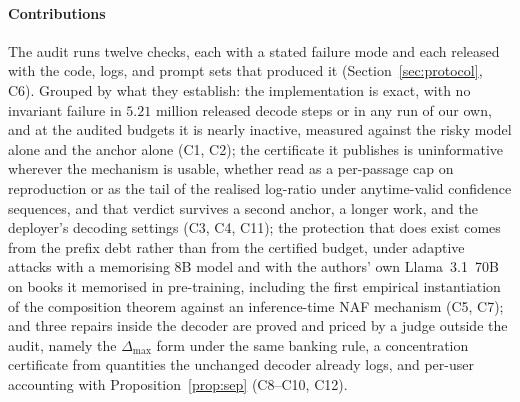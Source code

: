 \paragraph{Contributions}
The audit runs twelve checks, each with a stated failure mode and each released with the code, logs, and prompt sets that produced it (Section~\ref{sec:protocol}, C6). Grouped by what they establish: the implementation is exact, with no invariant failure in $5.21$ million released decode steps or in any run of our own, and at the audited budgets it is nearly inactive, measured against the risky model alone and the anchor alone (C1, C2); the certificate it publishes is uninformative wherever the mechanism is usable, whether read as a per-passage cap on reproduction or as the tail of the realised log-ratio under anytime-valid confidence sequences, and that verdict survives a second anchor, a longer work, and the deployer's decoding settings (C3, C4, C11); the protection that does exist comes from the prefix debt rather than from the certified budget, under adaptive attacks with a memorising 8B model and with the authors' own Llama~3.1~70B on books it memorised in pre-training, including the first empirical instantiation of the composition theorem against an inference-time NAF mechanism (C5, C7); and three repairs inside the decoder are proved and priced by a judge outside the audit, namely the $\Delta_{\max}$ form under the same banking rule, a concentration certificate from quantities the unchanged decoder already logs, and per-user accounting with Proposition~\ref{prop:sep} (C8--C10, C12).
